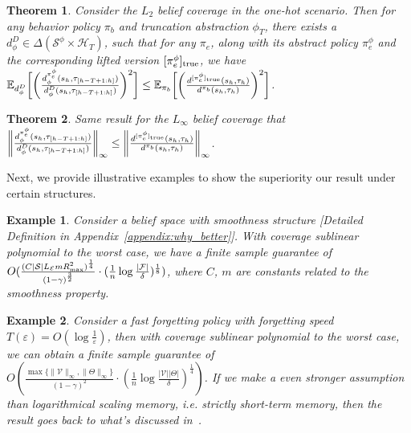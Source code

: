 \documentclass[twoside]{article}
\newtheorem{theorem}{Theorem}
\newtheorem{example}{Example}
\newcommand{\CAL}[1]{\mathcal{#1}}
\newcommand{\yplu}[1]{{\color{orange}{ [\textbf{Yiping:}} #1]}}
\begin{document}
\begin{theorem}\label{Thm:coverage_compare_2}
    Consider the $L_2$ belief coverage in the one-hot scenario. Then for any behavior policy $\pi_b$ and truncation abstraction $\phi_T$, there exists a $d^D_\phi\in \Delta(\CAL{S}^\phi\times \CAL{H}_T)$, such that for any $\pi_e$, along with its abstract policy $\pi_e^\phi$ and the corresponding lifted version $[\pi_e^\phi]_{\rm true}$, we have $\mathbb{E}_{d^D_\phi}\bigg[\bigg(\frac{d^{\pi_e^\phi}_\phi(s_h,{\tau_{[h-T+1:h]}})}{d^D_\phi(s_h,{\tau_{[h-T+1:h]}})}\bigg)^2\bigg]\leq\mathbb{E}_{\pi_b}\bigg[\bigg(\frac{d^{[\pi_e^\phi]_{\rm true}}(s_h,{\tau_h})}{d^{\pi_b}(s_h,{\tau_h})}\bigg)^2\bigg]$.
\end{theorem}


\begin{theorem}\label{Thm:coverage_compare_3}
    Same result for the $L_\infty$ belief coverage that $\bigg\|\frac{d^{\pi_e^\phi}_\phi(s_h,{\tau_{[h-T+1:h]}})}{d^{D}_\phi(s_h,{\tau_{[h-T+1:h]}})}\bigg\|_\infty\leq \bigg\|\frac{d^{[\pi_e^\phi]_{\rm true}}(s_h,{\tau_h})}{d^{\pi_b}(s_h,{\tau_h})}\bigg\|_\infty$.
\end{theorem}


Next, we provide illustrative examples to show the superiority our result under certain structures.%
\begin{example}\label{example:covering_num_H_infty}
    Consider a belief space with smoothness structure [Detailed Definition in Appendix~\ref{appendix:why_better}]. With coverage sublinear polynomial to the worst case, we have a finite sample guarantee of $O(\frac{(C|\CAL{S}|L_\CAL{E}mR_{\rm max}^2)^{\frac{1}{4}}}{(1-\gamma)^{\frac{3}{2}}}\cdot (\frac{1}{n}\log\frac{|\mathcal{F}|}{\delta})^{\frac{1}{8}})$, where $C$, $m$ are constants related to the smoothness property.
\end{example} %

\begin{example}\label{example:Fast_forgetting_H_infty}
    Consider a fast forgetting policy with forgetting speed $T(\varepsilon)=O(\log\frac{1}{\varepsilon})$, then with coverage sublinear polynomial to the worst case, we can obtain a finite sample guarantee of $O(\frac{\max\{\|\CAL{V}\|_\infty,\|\Theta\|_\infty\}}{(1-\gamma)^2}\cdot (\frac{1}{n}\log\frac{|\CAL{V}||{\Theta}|}{\delta})^{\frac{1}{4}})$. If we make a even stronger assumption than logarithmical scaling memory, i.e. strictly short-term memory, then the result goes back to what's discussed in~\cite{NEURIPS2023_3380e811, zhang2024cursesfuturehistoryfuturedependent}.
\end{example}
\end{document}
